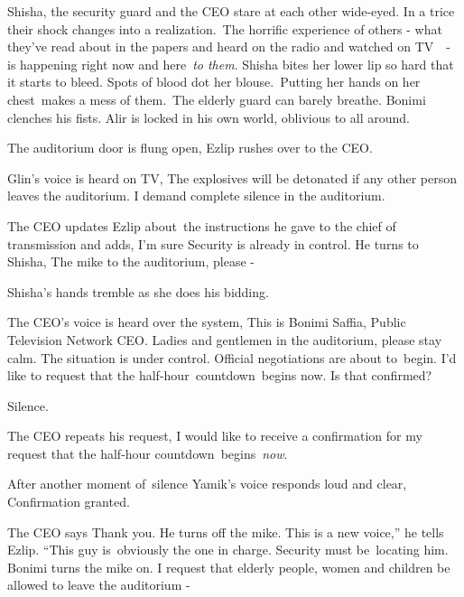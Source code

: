 \documentclass[letterpaper]{article}
\begin{document}
Shisha, the security guard and the CEO stare at each other wide-eyed. In a trice their shock changes into a
realization.\ The horrific experience of others -  what they've read about in the papers and heard on the radio and
watched on TV\ \ {}- is happening right now and here\ \textit{to them}. Shisha bites her lower lip so hard that it
starts to bleed. Spots of blood dot her blouse.\ Putting her hands on her chest\ makes a mess of them.\ The elderly
guard can barely breathe. Bonimi clenches his fists. Alir is locked in his own world, oblivious to all around.\ 

The auditorium door is flung open, Ezlip rushes over to the CEO.\ 

Glin's voice is heard on TV, {\textquotedbl}The explosives will be detonated if any other person leaves the auditorium.
I demand complete silence in the auditorium.{\textquotedbl}

The CEO updates Ezlip about~the instructions he gave to the chief of transmission and adds, {\textquotedbl}I'm sure
Security is already in control.{\textquotedbl} He turns to Shisha, {\textquotedbl}The mike to the auditorium, please
-{\textquotedbl}

Shisha's hands tremble as she does his bidding.

The CEO's voice is heard over the system, {\textquotedbl}This is Bonimi Saffia, Public Television Network CEO. Ladies
and gentlemen in the auditorium, please stay calm. The situation is under control. Official negotiations are about
to\textcolor[rgb]{0.0,0.4392157,0.7529412}{\ }begin. I'd like to request that the
half{}-hour\textcolor{red}{\ }countdown\textcolor{red}{\ }begins now. Is that confirmed?{\textquotedbl}

Silence.

The CEO repeats his request, {\textquotedbl}I would like to receive a confirmation for my request that the half{}-hour
countdown\ begins\ \textit{now}.{\textquotedbl}

After another moment of\ silence Yamik's voice responds loud and clear, {\textquotedbl}Confirmation
granted.{\textquotedbl} 

The CEO says {\textquotedbl}Thank you.{\textquotedbl} He turns off the mike. {\textquotedbl}This is a new voice,'' he
tells Ezlip. ``This guy is\textcolor[rgb]{0.0,0.4392157,0.7529412}{\ }obviously the one in charge. Security must
be\textcolor{red}{\ }locating him.{\textquotedbl} Bonimi turns the mike on. {\textquotedbl}I request that elderly
people, women and children be allowed to leave the auditorium -{\textquotedbl}
\end{document}
